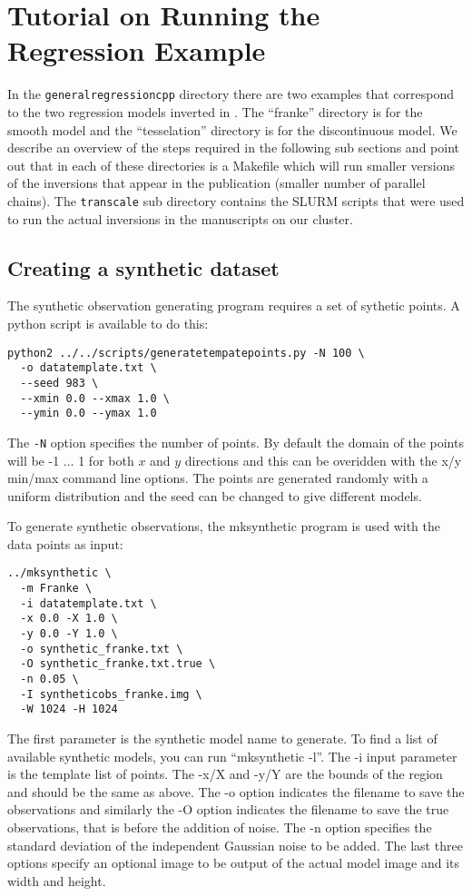 \documentclass[a4paper,12pt]{article}
\begin{document}
\section{Tutorial on Running the Regression Example}

In the {\tt generalregressioncpp} directory there are two examples that
correspond to the two regression models inverted in \citet{Hawkins:2018:B}.
The ``franke'' directory is for the smooth model and the ``tesselation''
directory is for the discontinuous model. We describe an overview of the
steps required in the following sub sections and point out that
in each of these directories is a Makefile which will run smaller
versions of the inversions that appear in the publication (smaller number
of parallel chains). The {\tt transcale} sub directory contains the
SLURM scripts that were used to run the actual inversions in the
manuscripts on our cluster.

\subsection{Creating a synthetic dataset}

The synthetic observation generating program requires a set of
sythetic points. A python script is available to do this:

\begin{verbatim}
python2 ../../scripts/generatetempatepoints.py -N 100 \
  -o datatemplate.txt \
  --seed 983 \
  --xmin 0.0 --xmax 1.0 \
  --ymin 0.0 --ymax 1.0 
\end{verbatim}

The {\tt -N} option specifies the number of points. By default the domain
of the points will be -1 $\ldots$ 1 for both $x$ and $y$ directions and this
can be overidden with the x/y min/max command line options. The points are generated
randomly with a uniform distribution and the seed can be changed to give different models.

To generate synthetic observations, the mksynthetic program is used with the
data points as input:

\begin{verbatim}
../mksynthetic \
  -m Franke \
  -i datatemplate.txt \
  -x 0.0 -X 1.0 \
  -y 0.0 -Y 1.0 \
  -o synthetic_franke.txt \
  -O synthetic_franke.txt.true \
  -n 0.05 \
  -I syntheticobs_franke.img \
  -W 1024 -H 1024
\end{verbatim}

The first parameter is the synthetic model name to generate. To find a
list of available synthetic models, you can run ``mksynthetic
-l''. The -i input parameter is the template list of points. The -x/X
and -y/Y are the bounds of the region and should be the same as
above. The -o option indicates the filename to save the observations
and similarly the -O option indicates the filename to save the true
observations, that is before the addition of noise. The -n option
specifies the standard deviation of the independent Gaussian noise to
be added. The last three options specify an optional image to be
output of the actual model image and its width and height.
\end{document}

